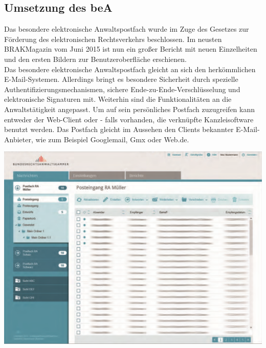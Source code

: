 \subsection{Umsetzung des beA}
Das besondere elektronische Anwaltspostfach wurde im Zuge des Gesetzes zur Förderung des elektronischen Rechtsverkehrs beschlossen. Im neusten BRAKMagazin vom Juni 2015 \textcite{bea:bea:brak3/2015}  ist nun ein großer Bericht mit neuen Einzelheiten und den ersten Bildern zur Benutzeroberfläche erschienen. \\
Das besondere elektronische Anwaltspostfach gleicht an sich den herkömmlichen E-Mail-Systemen. Allerdings bringt es besondere Sicherheit durch spezielle Authentifizierungsmechanismen, sichere Ende-zu-Ende-Verschlüsselung und elektronische Signaturen mit. Weiterhin sind die Funktionalitäten an die Anwaltstätigkeit angepasst. Um auf sein persönliches Postfach zuzugreifen kann entweder der Web-Client oder - falls vorhanden, die verknüpfte Kanzleisoftware benutzt werden. Das Postfach gleicht im Aussehen den Clients bekannter E-Mail-Anbieter, wie zum Beispiel Googlemail, Gmx oder Web.de.

\begin{center}
	\includegraphics[width=\textwidth]{beA-ui1.png}
	\label{bea:gui:overview}
\end{center}

